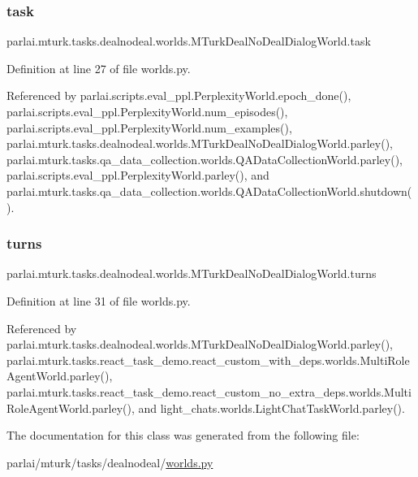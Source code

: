 \subsubsection{\texorpdfstring{task}{task}}
{\footnotesize\ttfamily parlai.\+mturk.\+tasks.\+dealnodeal.\+worlds.\+M\+Turk\+Deal\+No\+Deal\+Dialog\+World.\+task}



Definition at line 27 of file worlds.\+py.



Referenced by parlai.\+scripts.\+eval\+\_\+ppl.\+Perplexity\+World.\+epoch\+\_\+done(), parlai.\+scripts.\+eval\+\_\+ppl.\+Perplexity\+World.\+num\+\_\+episodes(), parlai.\+scripts.\+eval\+\_\+ppl.\+Perplexity\+World.\+num\+\_\+examples(), parlai.\+mturk.\+tasks.\+dealnodeal.\+worlds.\+M\+Turk\+Deal\+No\+Deal\+Dialog\+World.\+parley(), parlai.\+mturk.\+tasks.\+qa\+\_\+data\+\_\+collection.\+worlds.\+Q\+A\+Data\+Collection\+World.\+parley(), parlai.\+scripts.\+eval\+\_\+ppl.\+Perplexity\+World.\+parley(), and parlai.\+mturk.\+tasks.\+qa\+\_\+data\+\_\+collection.\+worlds.\+Q\+A\+Data\+Collection\+World.\+shutdown().

\mbox{\label{classparlai_1_1mturk_1_1tasks_1_1dealnodeal_1_1worlds_1_1MTurkDealNoDealDialogWorld_aa0ef48dc444aa808a5aae96dfb750771}} 
\subsubsection{\texorpdfstring{turns}{turns}}
{\footnotesize\ttfamily parlai.\+mturk.\+tasks.\+dealnodeal.\+worlds.\+M\+Turk\+Deal\+No\+Deal\+Dialog\+World.\+turns}



Definition at line 31 of file worlds.\+py.



Referenced by parlai.\+mturk.\+tasks.\+dealnodeal.\+worlds.\+M\+Turk\+Deal\+No\+Deal\+Dialog\+World.\+parley(), parlai.\+mturk.\+tasks.\+react\+\_\+task\+\_\+demo.\+react\+\_\+custom\+\_\+with\+\_\+deps.\+worlds.\+Multi\+Role\+Agent\+World.\+parley(), parlai.\+mturk.\+tasks.\+react\+\_\+task\+\_\+demo.\+react\+\_\+custom\+\_\+no\+\_\+extra\+\_\+deps.\+worlds.\+Multi\+Role\+Agent\+World.\+parley(), and light\+\_\+chats.\+worlds.\+Light\+Chat\+Task\+World.\+parley().



The documentation for this class was generated from the following file\+:\begin{DoxyCompactItemize}
\item 
parlai/mturk/tasks/dealnodeal/\hyperlink{parlai_2mturk_2tasks_2dealnodeal_2worlds_8py}{worlds.\+py}\end{DoxyCompactItemize}
